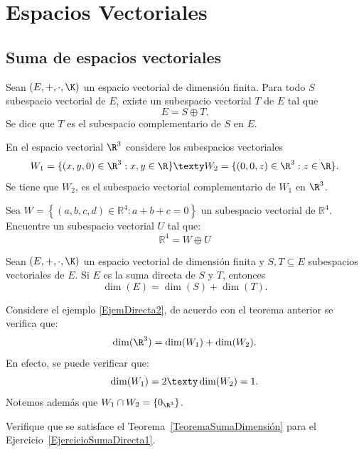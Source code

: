 \documentclass[compacto,10pt]{pubciencias-notas}
\begin{document}
\encabezado

\vspace*{-4mm}

\setcounter{section}{3}
\section{Espacios Vectoriales}
\setcounter{subsection}{7}
\subsection{Suma de espacios vectoriales}

\begin{teo}
    Sean $(E,+,\cdot,\K)$ un espacio vectorial de dimensión finita. Para todo $S$ subespacio vectorial de $E$, existe un subespacio vectorial $T$ de $E$ tal que 
    \[
        E = S \oplus T.
    \]
    Se dice que $T$ es el subespacio complementario de $S$ en $E$.
\end{teo}
\begin{ejem}\hspace{0pt}\label{EjemDirecta2} En el espacio vectorial $\R^{3}$ considere los subespacios vectoriales
\[
    W_{1} = \{(x,y,0)\in \R^3: x,y \in \R \}
    \texty 
    W_{2} = \{(0,0,z)\in \R^3: z \in \R\}.
\]
Se tiene que $W_2$, es el subespacio vectorial complementario de $W_1$ en $\R^{3}$.
\end{ejem}

\begin{ejer}\label{EjercicioSumaDirecta1}\hspace{0pt} Sea $W=\left\{(a,b,c,d)\in \mathbb{R}^{4} : a+b+c=0 \right\}$ un subespacio vectorial de $\mathbb{R}^{4}$. Encuentre un subespacio vectorial $U$ tal que:
\[\mathbb{R}^{4} = W \oplus U\]
\end{ejer}


\begin{teo}\label{TeoremaSumaDimensión}
Sean $(E,+,\cdot,\K)$ un espacio vectorial de dimensión finita y $S,T\subseteq E$ subespacios vectoriales de $E$. Si $E$ es la suma directa de $S$ y $T$, entonces
\[
    \dim(E) = \dim(S) + \dim(T).
\]
\end{teo}

\begin{ejem}\hspace{0pt} Considere el ejemplo \ref{EjemDirecta2}, de acuerdo con el teorema anterior se verifica que:
\[
    \dim(\R^{3}) = \dim(W_{1}) + \dim(W_{2}).
\]
En efecto, se puede verificar que:
\[
    \dim(W_{1}) = 2
    \texty
    \dim(W_{2}) = 1.
\]
Notemos además que $W_{1} \cap W_{2} = \{0_{\R^{3}}\}$.
\end{ejem}

\begin{ejer}\hspace{0pt} Verifique que se satisface el Teorema~\ref{TeoremaSumaDimensión} para el Ejercicio~\ref{EjercicioSumaDirecta1}.
    
\end{ejer}
\end{document}
